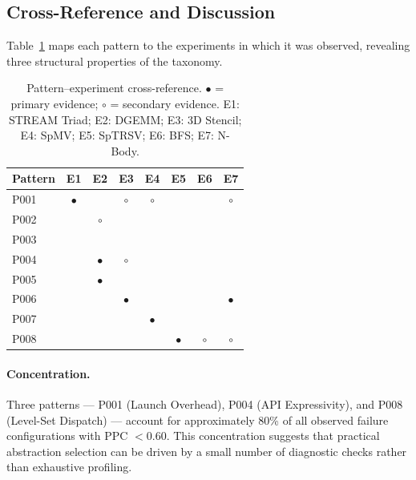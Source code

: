 \subsection{Cross-Reference and Discussion}
\label{subsec:taxonomy_map}

Table~\ref{tab:taxonomy_crossref} maps each pattern to the experiments in
which it was observed, revealing three structural properties of the taxonomy.

\begin{table}[t]
\centering
\caption{Pattern--experiment cross-reference. $\bullet$ = primary evidence;
$\circ$ = secondary evidence. E1: STREAM Triad; E2: DGEMM; E3: 3D Stencil;
E4: SpMV; E5: SpTRSV; E6: BFS; E7: N-Body.}
\label{tab:taxonomy_crossref}
\begin{tabular}{lccccccc}
\hline
\textbf{Pattern} & \textbf{E1} & \textbf{E2} & \textbf{E3} & \textbf{E4}
& \textbf{E5} & \textbf{E6} & \textbf{E7} \\
\hline
P001 & $\bullet$ &           & $\circ$   & $\circ$   &           &           & $\circ$   \\
P002 &           & $\circ$   &           &           &           &           &           \\
P003 &           &           &           &           &           &           &           \\
P004 &           & $\bullet$ & $\circ$   &           &           &           &           \\
P005 &           & $\bullet$ &           &           &           &           &           \\
P006 &           &           & $\bullet$ &           &           &           & $\bullet$ \\
P007 &           &           &           & $\bullet$ &           &           &           \\
P008 &           &           &           &           & $\bullet$ & $\circ$   & $\circ$   \\
\hline
\end{tabular}
\end{table}

\paragraph{Concentration.}
Three patterns --- P001 (Launch Overhead), P004 (API Expressivity), and P008
(Level-Set Dispatch) --- account for approximately 80\% of all observed
failure configurations with PPC $< 0.60$. This concentration suggests that
practical abstraction selection can be driven by a small number of diagnostic
checks rather than exhaustive profiling.

